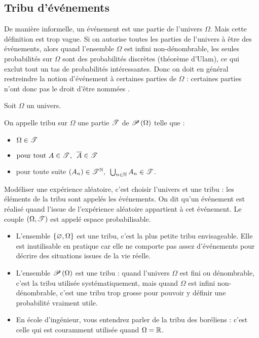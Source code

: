 \subsection{Tribu d'événements}

De manière informelle, un événement est une partie de l'univers \(\Omega\). Mais cette définition est trop vague. Si on autorise toutes les parties de l'univers à être des événements, alors quand l'ensemble \(\Omega\) est infini non-dénombrable, les seules probabilités sur \(\Omega\) sont des probabilités discrètes (théorème d'Ulam), ce qui exclut tout un tas de probabilités intéressantes. Donc on doit en général restreindre la notion d'événement à certaines parties de \(\Omega\) : certaines parties n'ont donc pas le droit d'être nommées .

\begin{defi}
Soit \(\Omega\) un univers.

On appelle tribu sur \(\Omega\) une partie \(\fami{T}\) de \(\P{\Omega}\) telle que :

\begin{itemize}
    \item \(\Omega\in\fami{T}\) \\
    \item \(\quantifs{\tpt A\in\fami{T}}\conj{A}\in\fami{T}\) \\
    \item pour toute suite \(\quantifs{\paren{A_n}\in\fami{T}^\N}\bigunion_{n\in\N}A_n\in\fami{T}\).
\end{itemize}
\end{defi}

Modéliser une expérience aléatoire, c'est choisir l'univers et une tribu : les éléments de la tribu sont appelés les événements. On dit qu'un événement est réalisé quand l'issue de l'expérience aléatoire appartient à cet événement. Le couple \(\groupe{\Omega}[\fami{T}]\) est appelé espace probabilisable.

\begin{ex}
\begin{itemize}
    \item L'ensemble \(\accol{\ensvide,\Omega}\) est une tribu, c'est la plus petite tribu envisageable. Elle est inutilisable en pratique car elle ne comporte pas assez d'événements pour décrire des situations issues de la vie réelle. \\
    \item L'ensemble \(\P{\Omega}\) est une tribu : quand l'univers \(\Omega\) est fini ou dénombrable, c'est la tribu utilisée systématiquement, mais quand \(\Omega\) est infini non-dénombrable, c'est une tribu trop grosse pour pouvoir y définir une probabilité vraiment utile. \\
    \item En école d'ingénieur, vous entendrez parler de la tribu des boréliens : c'est celle qui est couramment utilisée quand \(\Omega=\R\).
\end{itemize}
\end{ex}

